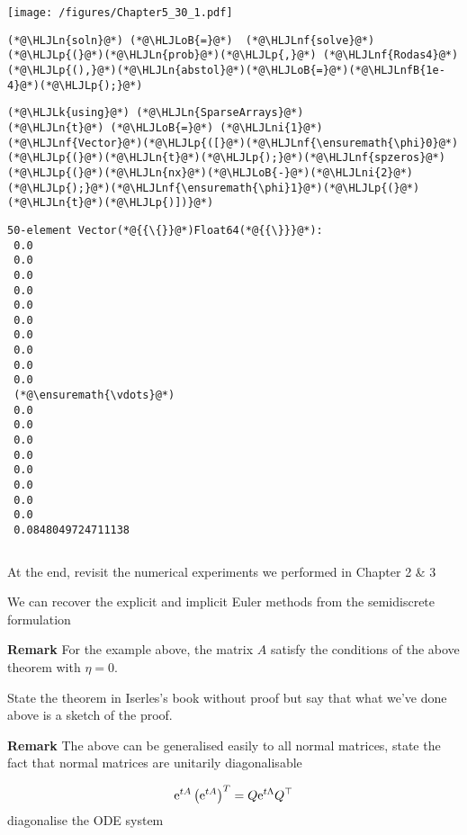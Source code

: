 \documentclass[12pt,a4paper]{article}
\newcommand{\HLJLk}[1]{\textcolor[RGB]{148,91,176}{\textbf{#1}}}
\newcommand{\HLJLn}[1]{#1}
\newcommand{\HLJLnf}[1]{\textcolor[RGB]{66,102,213}{#1}}
\newcommand{\HLJLnfB}[1]{\textcolor[RGB]{59,151,46}{#1}}
\newcommand{\HLJLni}[1]{\textcolor[RGB]{59,151,46}{#1}}
\newcommand{\HLJLoB}[1]{\textcolor[RGB]{102,102,102}{\textbf{#1}}}
\newcommand{\HLJLp}[1]{#1}
\begin{document}
\texttt{[image: /figures/Chapter5\_30\_1.pdf]}

\begin{lstlisting}
(*@\HLJLn{soln}@*) (*@\HLJLoB{=}@*)  (*@\HLJLnf{solve}@*)(*@\HLJLp{(}@*)(*@\HLJLn{prob}@*)(*@\HLJLp{,}@*) (*@\HLJLnf{Rodas4}@*)(*@\HLJLp{(),}@*)(*@\HLJLn{abstol}@*)(*@\HLJLoB{=}@*)(*@\HLJLnfB{1e-4}@*)(*@\HLJLp{);}@*)
\end{lstlisting}


\begin{lstlisting}
(*@\HLJLk{using}@*) (*@\HLJLn{SparseArrays}@*)
(*@\HLJLn{t}@*) (*@\HLJLoB{=}@*) (*@\HLJLni{1}@*)
(*@\HLJLnf{Vector}@*)(*@\HLJLp{([}@*)(*@\HLJLnf{\ensuremath{\phi}0}@*)(*@\HLJLp{(}@*)(*@\HLJLn{t}@*)(*@\HLJLp{);}@*)(*@\HLJLnf{spzeros}@*)(*@\HLJLp{(}@*)(*@\HLJLn{nx}@*)(*@\HLJLoB{-}@*)(*@\HLJLni{2}@*)(*@\HLJLp{);}@*)(*@\HLJLnf{\ensuremath{\phi}1}@*)(*@\HLJLp{(}@*)(*@\HLJLn{t}@*)(*@\HLJLp{)])}@*)
\end{lstlisting}

\begin{lstlisting}
50-element Vector(*@{{\{}}@*)Float64(*@{{\}}}@*):
 0.0
 0.0
 0.0
 0.0
 0.0
 0.0
 0.0
 0.0
 0.0
 0.0
 (*@\ensuremath{\vdots}@*)
 0.0
 0.0
 0.0
 0.0
 0.0
 0.0
 0.0
 0.0
 0.0848049724711138
\end{lstlisting}


\begin{lstlisting}

\end{lstlisting}


At the end, revisit the numerical experiments we performed in Chapter 2 \& 3

We can recover the explicit and implicit Euler methods from the semidiscrete formulation

\textbf{Remark} For the example above, the matrix $A$ satisfy the conditions of the above theorem with $\eta = 0$.

State the theorem in Iserles's book without proof but say that what we've done above is a sketch of the proof.

\textbf{Remark} The above can be generalised easily to all normal matrices, state the fact that normal matrices are unitarily diagonalisable

\[
{\rm e}^{tA}\left({\rm e}^{tA}\right)^{T} = Q{\rm e}^{t\Lambda}Q^{\top}
\]
diagonalise the ODE system
\end{document}
